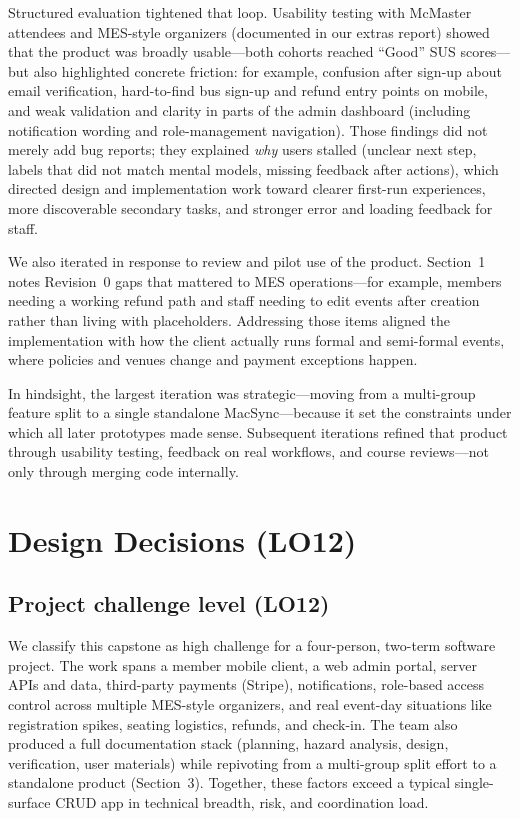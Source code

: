 \documentclass{article}
\begin{document}
Structured evaluation tightened that loop. Usability testing with
McMaster attendees and MES-style organizers (documented in our extras report)
showed that the product was broadly usable---both cohorts reached ``Good'' SUS
scores---but also highlighted concrete friction: for example, confusion after
sign-up about email verification, hard-to-find bus sign-up and refund entry
points on mobile, and weak validation and clarity in parts of the admin
dashboard (including notification wording and role-management navigation).
Those findings did not merely add bug reports; they explained \emph{why} users
stalled (unclear next step, labels that did not match mental models, missing
feedback after actions), which directed design and implementation work toward
clearer first-run experiences, more discoverable secondary tasks, and stronger
error and loading feedback for staff.

We also iterated in response to review and pilot use of the product.
Section~1 notes Revision~0 gaps that mattered to MES operations---for example,
members needing a working refund path and staff needing to edit events after
creation rather than living with placeholders. Addressing those items aligned the
implementation with how the client actually runs formal and semi-formal events,
where policies and venues change and payment exceptions happen.

In hindsight, the largest iteration was strategic---moving from a
multi-group feature split to a single standalone MacSync---because it set the
constraints under which all later prototypes made sense. Subsequent iterations
refined that product through usability testing, feedback on real workflows, and
course reviews---not only through merging code internally.

\section{Design Decisions (LO12)}

\subsection{Project challenge level (LO12)}

We classify this capstone as high challenge for a four-person, two-term
software project. The work spans a member mobile client, a
web admin portal, server APIs and data, third-party
payments (Stripe), notifications, role-based access control
across multiple MES-style organizers, and real event-day situations like registration spikes, seating logistics,
refunds, and check-in. The team
also produced a full documentation stack (planning, hazard analysis, design,
verification, user materials) while repivoting from a multi-group split
effort to a standalone product (Section~3). Together, these factors exceed a
typical single-surface CRUD app in technical breadth, risk, and coordination
load.
\end{document}
